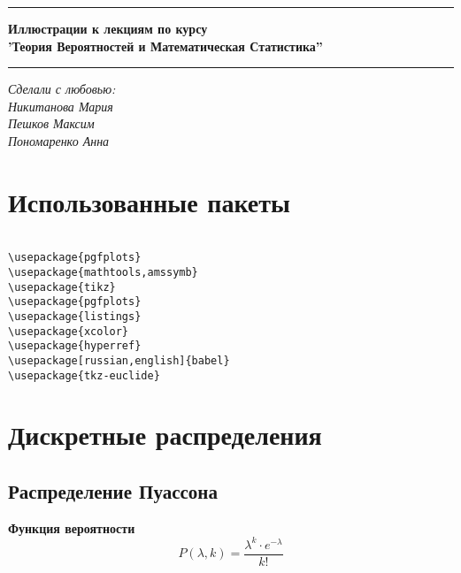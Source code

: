 \documentclass[12pt,a4paper]{article}
\begin{document}
\noindent\rule{16.5cm}{0.4pt}

\LARGE
\begin{center}
\textbf{Иллюстрации к лекциям по курсу \\
	'Теория Вероятностей и Математическая Статистика''}
\end{center}
\normalsize

\noindent\rule{16.5cm}{0.4pt}
\begin{flushright}
\textit{Сделали с любовью: \\ 
Никитанова Мария\\
Пешков Максим\\
Пономаренко Анна}
\end{flushright}


\tableofcontents
\clearpage

\section{Использованные пакеты}

\begin{lstlisting}

\usepackage{pgfplots}
\usepackage{mathtools,amssymb}
\usepackage{tikz}
\usepackage{pgfplots}
\usepackage{listings}
\usepackage{xcolor}
\usepackage{hyperref}
\usepackage[russian,english]{babel}
\usepackage{tkz-euclide}

\end{lstlisting}
\clearpage

\section{Дискретные распределения}

\subsection{Распределение Пуассона}

\textbf{Функция вероятности}
\begin{equation*}
  P(\lambda, k) = \dfrac{\lambda^k \cdot e^{-\lambda}}{k!} 
\end{equation*}
\end{document}
